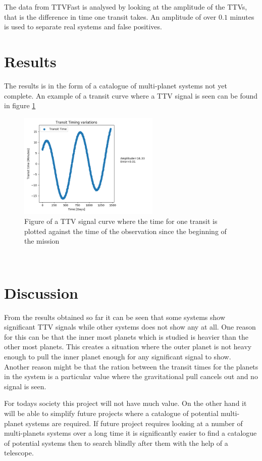 \documentclass[titlepage]{article}
\begin{document}
	The data from TTVFast is analysed by looking at the amplitude of the TTVs, that is the difference in time one transit takes. An amplitude of over $0.1$ minutes is used to separate real systems and false positives.
\section{Results}
	The results is in the form of a catalogue of multi-planet systems not yet complete. An example of a transit curve where a TTV signal is seen can be found in figure \ref{fig:TTV}
	
	\begin{figure}[h!]
		\centering
		\captionsetup{justification=centering}
		\includegraphics[width=0.6\textwidth]{K00221.png}
		\caption{Figure of a TTV signal curve where the time for one transit is plotted against the time of the observation since the beginning of the mission}
		\label{fig:TTV}
	\end{figure}\
\section{Discussion}
	From the results obtained so far it can be seen that some systems show significant TTV signals while other systems does not show any at all. One reason for this can be that the inner most planets which is studied is heavier than the other most planets. This creates a situation where the outer planet is not heavy enough to pull the inner planet enough for any significant signal to show. Another reason might be that the ration between the transit times for the planets in the system is a particular value where the gravitational pull cancels out and no signal is seen.
	
	
	For todays society this project will not have much value. On the other hand it will be able to simplify future projects where a catalogue of potential multi-planet systems are required. If future project requires looking at a number of multi-planets systems over a long time it is significantly easier to find a catalogue of potential systems then to search blindly after them with the help of a telescope.
\end{document}
